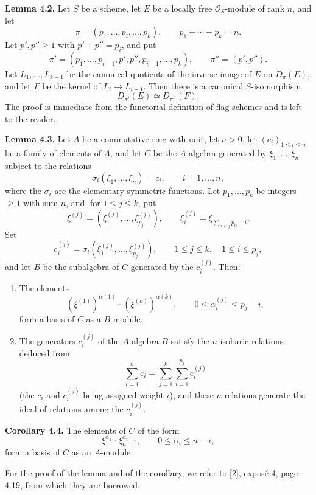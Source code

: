 \documentclass[11pt]{article}
\begin{document}
\textbf{Lemma 4.2.} Let \(S\) be a scheme, let \(E\) be a locally free \(\mathcal O_S\)-module of rank \(n\), and let
\[
  \pi=(p_1,\ldots,p_i,\ldots,p_k),\qquad p_1+\cdots+p_k=n.
\]
Let \(p',p''\geq1\) with \(p'+p''=p_i\), and put
\[
  \pi'=(p_1,\ldots,p_{i-1},p',p'',p_{i+1},\ldots,p_k),
  \qquad
  \pi''=(p',p'').
\]
Let \(L_1,\ldots,L_{k-1}\) be the canonical quotients of the inverse image of \(E\) on \(D_\pi(E)\), and let \(F\) be the kernel of \(L_i\to L_{i-1}\). Then there is a canonical \(S\)-isomorphism
\[
  D_{\pi'}(E)\simeq D_{\pi''}(F).
\]
The proof is immediate from the functorial definition of flag schemes and is left to the reader.

\textbf{Lemma 4.3.} Let \(A\) be a commutative ring with unit, let \(n>0\), let \((c_i)_{1\leq i\leq n}\) be a family of elements of \(A\), and let \(C\) be the \(A\)-algebra generated by \(\xi_1,\ldots,\xi_n\) subject to the relations
\[
  \sigma_i(\xi_1,\ldots,\xi_n)=c_i,\qquad i=1,\ldots,n,
\]
where the \(\sigma_i\) are the elementary symmetric functions. Let \(p_1,\ldots,p_k\) be integers \(\geq1\) with sum \(n\), and, for \(1\leq j\leq k\), put
\[
  \xi^{(j)}=(\xi^{(j)}_1,\ldots,\xi^{(j)}_{p_j}),
  \qquad
  \xi^{(j)}_i=\xi_{\sum_{\alpha<j}p_\alpha+i}.
\]
Set
\[
  c_i^{(j)}=\sigma_i(\xi^{(j)}_1,\ldots,\xi^{(j)}_{p_j}),
  \qquad 1\leq j\leq k,\quad 1\leq i\leq p_j,
\]
and let \(B\) be the subalgebra of \(C\) generated by the \(c_i^{(j)}\). Then:

\begin{enumerate}[label=\roman*)]
\item The elements
\[
  (\xi^{(1)})^{\alpha(1)}\cdots(\xi^{(k)})^{\alpha(k)},
  \qquad
  0\leq \alpha_i^{(j)}\leq p_j-i,
\]
form a basis of \(C\) as a \(B\)-module.

\item The generators \(c_i^{(j)}\) of the \(A\)-algebra \(B\) satisfy the \(n\) isobaric relations deduced from
\[
  \sum_{i=1}^{n}c_i
  =
  \sum_{j=1}^{k}\sum_{i=1}^{p_j}c_i^{(j)}
\]
(the \(c_i\) and \(c_i^{(j)}\) being assigned weight \(i\)), and these \(n\) relations generate the ideal of relations among the \(c_i^{(j)}\).
\end{enumerate}

\textbf{Corollary 4.4.} The elements of \(C\) of the form
\[
  \xi_1^{\alpha_1}\cdots \xi_{n-1}^{\alpha_{n-1}},
  \qquad 0\leq \alpha_i\leq n-i,
\]
form a basis of \(C\) as an \(A\)-module.

For the proof of the lemma and of the corollary, we refer to [2], exposé 4, page 4.19, from which they are borrowed.
\end{document}
